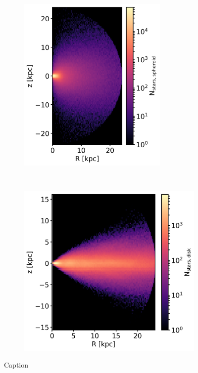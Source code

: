 \begin{figure}
\captionsetup{format=plain}
    \centering
    \begin{subfigure}
        \centering
	    \includegraphics[width=0.8\textwidth]{plots/Auriga/spheroid_selection_Rz_snap_127.png}
    \end{subfigure}
    ~
    \begin{subfigure}
        \centering
	    \includegraphics{plots/Auriga/disk_selection_Rz_snap_127.png}
    \end{subfigure}
    \caption{Caption}
    \label{fig:disk_spheroid_dist}
\end{figure}
\fi

